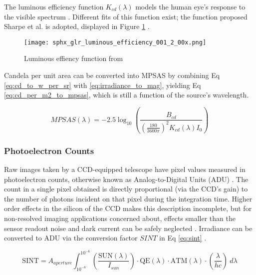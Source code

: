The luminous efficiency function $K_{cd}(\lambda)$ models the human eye's response to the visible spectrum \cite{sharpe2005}. Different fits of this function exist; the function proposed Sharpe et al. is adopted, displayed in Figure \ref{fig:luminous_efficiency} \cite{sharpe2005}.

\begin{figure}[ht]
  \centering
  \texttt{[image: sphx\_glr\_luminous\_efficiency\_001\_2\_00x.png]}
  \caption{Luminous effiency function from \cite{sharpe2005}}
  \label{fig:luminous_efficiency}
\end{figure}

Candela per unit area can be converted into MPSAS by combining Eq \ref{eq:cd_to_w_per_sr} with \ref{eq:irradiance_to_mag}, yielding Eq \ref{eq:cd_per_m2_to_mpsas}, which is still a function of the source's wavelength.

\begin{equation} \label{eq:cd_per_m2_to_mpsas}
  MPSAS(\lambda) = -2.5 \log_{10}\left( \frac{B_{cd}}{\left( \frac{180}{ 3600\pi} \right)^2 K_{cd}(\lambda) I_0} \right)
\end{equation}

\subsubsection{Photoelectron Counts}

Raw images taken by a CCD-equipped telescope have pixel values measured in photoelectron
counts, otherwise known as Analog-to-Digital Units (ADU) \cite{krag2003}. The count in a single
pixel obtained is directly proportional (via the CCD's gain) to the number of
photons incident on that pixel during the integration time. Higher order effects in the silicon of
the CCD makes this description incomplete, but for non-resolved imaging applications
concerned about, effects smaller than the sensor readout noise and dark current can be safely neglected
\cite{frueh2019notes}. Irradiance can be converted to ADU via the conversion factor $SINT$
in Eq \ref{eq:sint} \cite{krag2003}.

\begin{equation} \label{eq:sint}
 \textrm{SINT} = A_{aperture}
	\int_{10^{-8}}^{10^{-6}}{ \left( \frac{\textrm{SUN}(\lambda)}{I_{sun}} \right) \cdot \textrm{QE}(\lambda) \cdot \textrm{ATM}(\lambda)
  \cdot \left( \frac{\lambda}{h c} \right) \: d\lambda}  
\end{equation}

